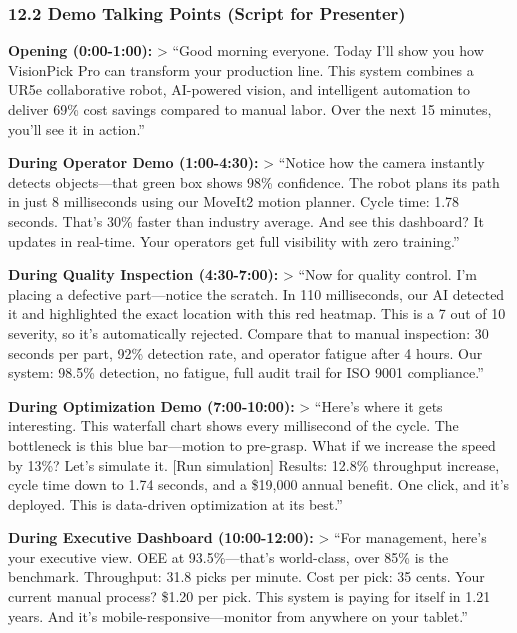 \documentclass[
]{article}
\begin{document}
\hypertarget{demo-talking-points-script-for-presenter}{%
\subsubsection{12.2 Demo Talking Points (Script for
Presenter)}\label{demo-talking-points-script-for-presenter}}

\textbf{Opening (0:00-1:00):} \textgreater{} ``Good morning everyone.
Today I'll show you how VisionPick Pro can transform your production
line. This system combines a UR5e collaborative robot, AI-powered
vision, and intelligent automation to deliver 69\% cost savings compared
to manual labor. Over the next 15 minutes, you'll see it in action.''

\textbf{During Operator Demo (1:00-4:30):} \textgreater{} ``Notice how
the camera instantly detects objects---that green box shows 98\%
confidence. The robot plans its path in just 8 milliseconds using our
MoveIt2 motion planner. Cycle time: 1.78 seconds. That's 30\% faster
than industry average. And see this dashboard? It updates in real-time.
Your operators get full visibility with zero training.''

\textbf{During Quality Inspection (4:30-7:00):} \textgreater{} ``Now for
quality control. I'm placing a defective part---notice the scratch. In
110 milliseconds, our AI detected it and highlighted the exact location
with this red heatmap. This is a 7 out of 10 severity, so it's
automatically rejected. Compare that to manual inspection: 30 seconds
per part, 92\% detection rate, and operator fatigue after 4 hours. Our
system: 98.5\% detection, no fatigue, full audit trail for ISO 9001
compliance.''

\textbf{During Optimization Demo (7:00-10:00):} \textgreater{} ``Here's
where it gets interesting. This waterfall chart shows every millisecond
of the cycle. The bottleneck is this blue bar---motion to pre-grasp.
What if we increase the speed by 13\%? Let's simulate it. {[}Run
simulation{]} Results: 12.8\% throughput increase, cycle time down to
1.74 seconds, and a \$19,000 annual benefit. One click, and it's
deployed. This is data-driven optimization at its best.''

\textbf{During Executive Dashboard (10:00-12:00):} \textgreater{} ``For
management, here's your executive view. OEE at 93.5\%---that's
world-class, over 85\% is the benchmark. Throughput: 31.8 picks per
minute. Cost per pick: 35 cents. Your current manual process? \$1.20 per
pick. This system is paying for itself in 1.21 years. And it's
mobile-responsive---monitor from anywhere on your tablet.''
\end{document}
